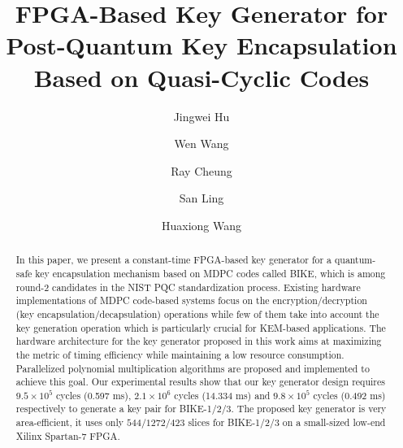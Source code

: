 \documentclass[runningheads]{llncs}
\begin{document}
%
\title{FPGA-Based Key Generator for Post-Quantum Key Encapsulation Based on Quasi-Cyclic Codes}
%
%
\author{Jingwei Hu \and Wen Wang \and Ray Cheung \and San Ling \and Huaxiong Wang}



%


%
\maketitle              %
%


\begin{abstract}
In this paper, we present a constant-time FPGA-based key generator for a
quantum-safe key encapsulation mechanism based on MDPC codes
called BIKE,
which is among round-2 candidates in the NIST PQC standardization process.
Existing hardware implementations of MDPC code-based systems
focus on the encryption/decryption (key encapsulation/decapsulation)
operations while few of them take into account
the key generation operation which is particularly crucial for
KEM-based applications.
The hardware architecture for the key generator
proposed in this work
aims at maximizing the metric of timing efficiency
while maintaining a low resource consumption.
Parallelized polynomial multiplication algorithms are proposed
and implemented to achieve this goal.
Our experimental results show that our key generator design
requires $9.5\times 10^5$ cycles (0.597 ms),
$2.1\times 10^6$ cycles (14.334 ms) and $9.8\times 10^5$ cycles (0.492 ms)
respectively
to generate a key pair for BIKE-1/2/3.
The proposed key generator is very area-efficient,
it uses only $544/1272/423$ slices for BIKE-1/2/3 on
a small-sized low-end Xilinx Spartan-7 FPGA.

\end{abstract}
%
%
%
\end{document}
